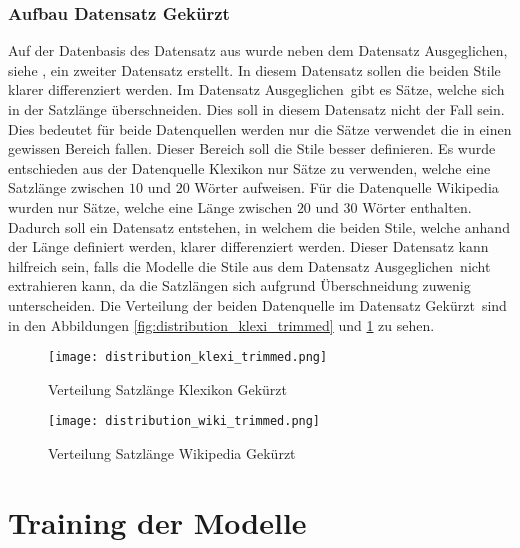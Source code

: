 \subsubsection{Aufbau Datensatz \flqq Gekürzt\frqq}
\label{sub:datensatz_gekuertz}
Auf der Datenbasis des Datensatz aus  wurde neben dem Datensatz \flqq
Ausgeglichen\frqq, siehe , ein zweiter Datensatz erstellt. In diesem Datensatz
sollen die beiden Stile klarer differenziert werden. Im Datensatz \flqq Ausgeglichen\frqq \ gibt es Sätze, welche sich
in der Satzlänge überschneiden. Dies soll in diesem Datensatz nicht der Fall sein. Dies bedeutet für beide Datenquellen
werden nur die Sätze verwendet die in einen gewissen Bereich fallen. Dieser Bereich soll die Stile besser definieren. Es
wurde entschieden aus der Datenquelle Klexikon nur Sätze zu verwenden, welche eine Satzlänge zwischen $ 10 $ und $ 20 $
Wörter aufweisen. Für die Datenquelle Wikipedia wurden nur Sätze, welche eine Länge zwischen $ 20 $ und $ 30 $ Wörter
enthalten. Dadurch soll ein Datensatz entstehen, in welchem die beiden Stile, welche anhand der Länge definiert werden,
klarer differenziert werden. Dieser Datensatz kann hilfreich sein, falls die Modelle die Stile aus dem Datensatz \flqq
Ausgeglichen\frqq \ nicht extrahieren kann, da die Satzlängen sich aufgrund Überschneidung zuwenig unterscheiden. Die
Verteilung der beiden Datenquelle im Datensatz \flqq Gekürzt\frqq \ sind in den Abbildungen
\ref{fig:distribution_klexi_trimmed} und \ref{fig:distribution_wiki_trimmed} zu sehen.
\begin{figure}[H]
    \texttt{[image: distribution\_klexi\_trimmed.png]}
    \caption{Verteilung Satzlänge Klexikon \flqq Gekürzt\frqq}\label{fig:distribution_klexi_trimmed}
  \endminipage\hfill
    \texttt{[image: distribution\_wiki\_trimmed.png]}
    \caption{Verteilung Satzlänge Wikipedia \flqq Gekürzt\frqq}\label{fig:distribution_wiki_trimmed}
  \endminipage\hfill
\end{figure}

\newpage

\section{Training der Modelle}
\label{sec:resultate}

